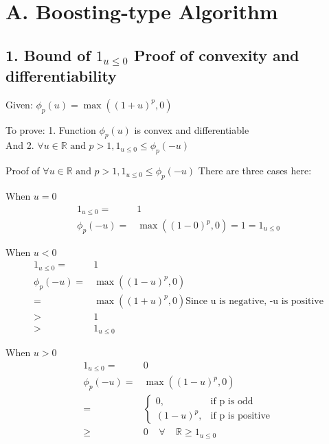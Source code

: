 \documentclass{article}
\begin{document}
\section*{A. Boosting-type Algorithm}
\subsection*{1. Bound of \( 1_{u \le 0} \) Proof of convexity and differentiability}
\begin{description}
  \item{Given: } \( \phi_{p}(u) = \max( {(1 + u)}^{p}, 0) \)
  \item{To prove:} 1. Function \( \phi_{p}(u) \) is convex and differentiable \\ And 2. \( \forall u \in \mathbb{R} \textrm{ and } p > 1,  1_{u \le 0} \le \phi_{p}(-u) \)
  \item{Proof of \( \forall u \in \mathbb{R} \textrm{ and } p > 1,  1_{u \le 0} \le \phi_{p}(-u) \)}
    There are three cases here:
    
    When \( u = 0\)
    \begin{align*}
        1_{u \le 0} = &1 \\
        \phi_{p}(-u) = & \max( {(1 - 0)}^{p}, 0) = 1 = 1_{u \le 0}
    \end{align*}

    When \( u < 0\)
    \begin{align*}
        1_{u \le 0} = &1 \\
        \phi_{p}(-u) = & \max( {(1 - u)}^{p}, 0)  \\
        =& \max( {(1 + u)}^{p}, 0)  \textrm{Since u is negative, -u is positive} \\
        > & 1 \\
        > & 1_{u \le 0}
    \end{align*}

    When \( u > 0 \)
    \begin{align*}
        1_{u \le 0} = & 0 \\
        \phi_{p}(-u) = & \max( {(1 - u)}^{p}, 0)  \\
        = & 
        \begin{cases}
          0, & \textrm{if p is odd} \\
          {(1-u)}^p, & \textrm{if p is positive}
        \end{cases} \\
        \ge & 0 \;\;\;\; \forall \;\;\;\; \mathbb{R}
        \ge 1_{u \le 0}
    \end{align*}


\end{description}
\end{document}
